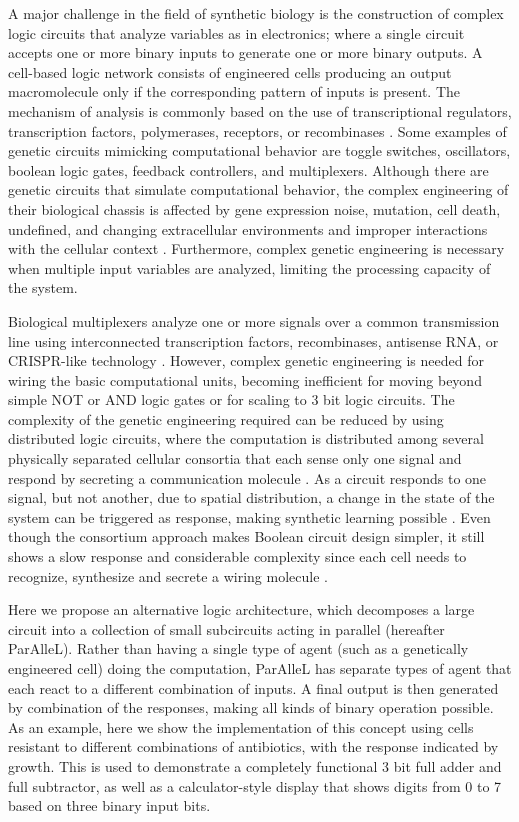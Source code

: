 A major challenge in the field of synthetic biology is the construction of complex logic circuits that analyze variables as in electronics; where a single circuit accepts one or more binary inputs to generate one or more binary outputs. A cell-based logic network consists of engineered cells producing an output macromolecule only if the corresponding pattern of inputs is present. The mechanism of analysis is commonly based on the use of transcriptional regulators, transcription factors, polymerases, receptors, or recombinases \citep{brenner2018synthetic}. Some examples of genetic circuits mimicking computational behavior are toggle switches, oscillators, boolean logic gates, feedback controllers, and multiplexers. Although there are genetic circuits that simulate computational behavior, the complex engineering of their biological chassis is affected by gene expression noise, mutation, cell death, undefined, and changing extracellular environments and improper interactions with the cellular context \citep{andrianantoandro2006synthetic}. Furthermore, complex genetic engineering is necessary when multiple input variables are analyzed, limiting the processing capacity of the system.


Biological multiplexers analyze one or more signals over a common transmission line using interconnected transcription factors, recombinases, antisense RNA, or CRISPR-like technology \citep{nielsen2014multi,roquet2016synthetic,brenner2018synthetic}. However, complex genetic engineering is needed for wiring the basic computational units, becoming inefficient for moving beyond simple NOT or AND logic gates or for scaling to 3 bit logic circuits. The complexity of the genetic engineering required can be reduced by using distributed logic circuits, where the computation is distributed among several physically separated cellular consortia that each sense only one signal and respond by secreting a communication molecule \citep{regot2011distributed}. As a circuit responds to one signal, but not another, due to spatial distribution, a change in the state of the system can be triggered as response, making synthetic learning possible \citep{macia2017synthetic,shipman2017crispr}. Even though the consortium approach makes Boolean circuit design simpler, it still shows a slow response and considerable complexity since each cell needs to recognize, synthesize and secrete a wiring molecule \citep{macia2016implementation}.

Here we propose an alternative logic architecture, which decomposes a large circuit into a collection of small subcircuits acting in parallel (hereafter ParAlleL). Rather than having a single type of agent (such as a genetically engineered cell) doing the computation, ParAlleL has separate types of agent that each react to a different combination of inputs. A final output is then generated by combination of the responses, making all kinds of binary operation possible. As an example, here we show the implementation of this concept using cells resistant to different combinations of antibiotics, with the response indicated by growth. This is used to demonstrate a completely functional 3 bit full adder and full subtractor, as well as a calculator-style display that shows digits from 0 to 7 based on three binary input bits.

